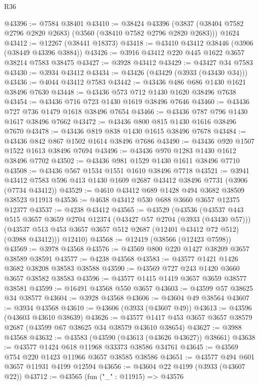 \begin{lexlean}{R36}
\begin{coremodule}
@43396 := @7584 @38401
@43410 := @38424
    @43396
    (@3837 (@38404 @7582 @2796 @2820 @2683) (@3560 (@38410 @7582 @2796 @2820 @2683)))
    @1624
@43412 := @12267 (@38441 @18373)
@43418 := @43410 @43412 @38446 (@3906 (@38449 @43396 @3884))
@43426 := @3916 @43412 @220 @445 @1622 @3657 @38214 @7583 @38475
@43427 := @3928 @43412
@43429 := @43427 @34 @7583
@43430 := @3934 @43412
@43434 := @43426 (@43429 (@3933 (@43430 @34)))
@43436 := @4044 @43412 @7583
@43442 := @43436 @486 @686 @1430 @1621 @38496 @7630
@43448 := @43436 @573 @712 @1430 @1620 @38496 @7638
@43454 := @43436 @716 @723 @1430 @1619 @38496 @7646
@43460 := @43436 @727 @736 @1479 @1618 @38496 @7654
@43466 := @43436 @787 @796 @1430 @1617 @38496 @7662
@43472 := @43436 @800 @815 @1430 @1616 @38496 @7670
@43478 := @43436 @819 @838 @1430 @1615 @38496 @7678
@43484 := @43436 @842 @867 @1502 @1614 @38496 @7686
@43490 := @43436 @920 @1507 @1522 @1613 @38496 @7694
@43496 := @43436 @970 @1283 @1430 @1612 @38496 @7702
@43502 := @43436 @981 @1529 @1430 @1611 @38496 @7710
@43508 := @43436 @567 @1534 @1551 @1610 @38496 @7718
@43521 := @3941 @43412 @7583 @596 @413 @1430 @1609 @2687 @43412 @38496 @7731 (@3906 (@7734 @43412))
@43529 := @4610 @43412 @689 @1428 @494 @3682 @38509 @38523 @11913
@43536 := @4638 @43412 @530 @688 @3660 @3657 @12375 @12377
@43537 := @4238 @43412
@43565 := @43529
    (@43536
      (@43537
        @443
        @515
        @3657
        @3659
        @2704
        @12374
        (@43427 @57 @2704 (@3933 (@43430 @57)))
        (@43537 @513 @453 @3657 @3657 @512 @2687 (@12401 @43412 @72 @512) (@3988 @43412)))
      @12410)
@43568 := @12419 (@38566 (@12423 @7598))
@43569 := @3978 @43568
@43576 := @43569 @800 @220 @1427 @38209 @3657 @38589 @38591
@43577 := @4238 @43568
@43583 := @43577 @1421 @1426 @3682 @38208 @38583 @38588
@43590 := @43569 @727 @243 @1420 @3660 @3657 @38582 @38583
@43596 := @43577 @1415 @1419 @3657 @3659 @38577 @38581
@43599 := @16491 @43568 @550 @3657
@43603 := @43599 @57 @38625 @34 @38577
@43604 := @3928 @43568
@43606 := @43604 @49 @38564
@43607 := @3934 @43568
@43610 := @43606 (@3933 (@43607 @49))
@43613 := @43596 (@43603 @43610 @38639)
@43626 := @43577 @1417 @453 @3657 @3657 @38579 @2687 (@43599 @67 @38625 @34 @38579 @43610 @38654)
@43627 := @3988 @43568
@43632 := @43583 (@43590 (@43613 (@43626 @43627)) @38661)
@43638 := @43577 @1424 @618 @11968 @33373 @38586 @34761
@43645 := @43569 @754 @220 @1423 @11966 @3657 @38585 @38586
@43651 := @43577 @494 @601 @3657 @11931 @4199 @12594
@43656 := @43604 @22 @4199 (@3933 (@43607 @22))
@43712 := @43565
    (fun ("_" : @11915) =>
    @43576

\end{coremodule}
\end{lexlean}

